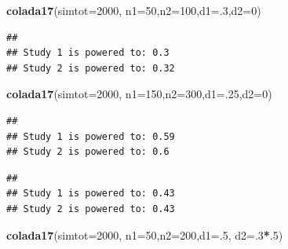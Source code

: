\documentclass[]{book}
\newenvironment{Shaded}{\begin{snugshade}}{\end{snugshade}}
\newcommand{\CommentTok}[1]{\textcolor[rgb]{0.56,0.35,0.01}{\textit{#1}}}
\newcommand{\DataTypeTok}[1]{\textcolor[rgb]{0.13,0.29,0.53}{#1}}
\newcommand{\DecValTok}[1]{\textcolor[rgb]{0.00,0.00,0.81}{#1}}
\newcommand{\KeywordTok}[1]{\textcolor[rgb]{0.13,0.29,0.53}{\textbf{#1}}}
\newcommand{\NormalTok}[1]{#1}
\newcommand{\OperatorTok}[1]{\textcolor[rgb]{0.81,0.36,0.00}{\textbf{#1}}}
\begin{document}
\begin{Shaded}
\begin{Highlighting}[]
  \KeywordTok{colada17}\NormalTok{(}\DataTypeTok{simtot=}\DecValTok{2000}\NormalTok{, }\DataTypeTok{n1=}\DecValTok{50}\NormalTok{,}\DataTypeTok{n2=}\DecValTok{100}\NormalTok{,}\DataTypeTok{d1=}\NormalTok{.}\DecValTok{3}\NormalTok{,}\DataTypeTok{d2=}\DecValTok{0}\NormalTok{)}
\end{Highlighting}
\end{Shaded}

\begin{verbatim}
## 
## Study 1 is powered to: 0.3
## Study 2 is powered to: 0.32
\end{verbatim}

\begin{Shaded}
\begin{Highlighting}[]
  \KeywordTok{colada17}\NormalTok{(}\DataTypeTok{simtot=}\DecValTok{2000}\NormalTok{, }\DataTypeTok{n1=}\DecValTok{150}\NormalTok{,}\DataTypeTok{n2=}\DecValTok{300}\NormalTok{,}\DataTypeTok{d1=}\NormalTok{.}\DecValTok{25}\NormalTok{,}\DataTypeTok{d2=}\DecValTok{0}\NormalTok{)}
\end{Highlighting}
\end{Shaded}

\begin{verbatim}
## 
## Study 1 is powered to: 0.59
## Study 2 is powered to: 0.6
\end{verbatim}

\begin{Shaded}
\end{Shaded}

\begin{verbatim}
## 
## Study 1 is powered to: 0.43
## Study 2 is powered to: 0.43
\end{verbatim}

\begin{Shaded}
\begin{Highlighting}[]
  \KeywordTok{colada17}\NormalTok{(}\DataTypeTok{simtot=}\DecValTok{2000}\NormalTok{, }\DataTypeTok{n1=}\DecValTok{50}\NormalTok{,}\DataTypeTok{n2=}\DecValTok{200}\NormalTok{,}\DataTypeTok{d1=}\NormalTok{.}\DecValTok{5}\NormalTok{, }\DataTypeTok{d2=}\NormalTok{.}\DecValTok{3}\OperatorTok{*}\NormalTok{.}\DecValTok{5}\NormalTok{)}
\end{Highlighting}
\end{Shaded}
\end{document}
